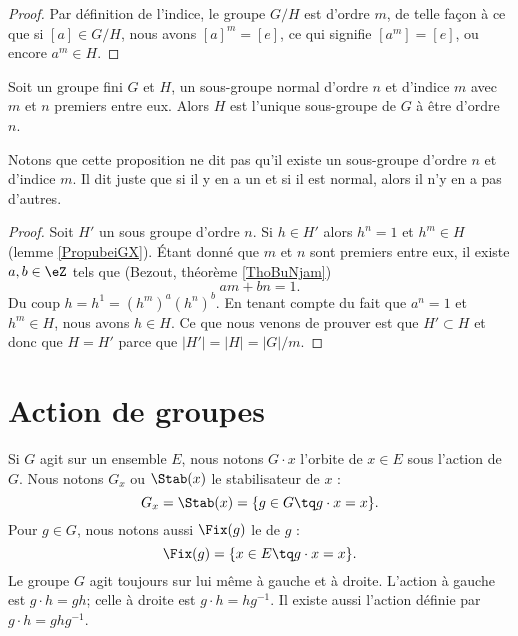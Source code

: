 \begin{proof}
    Par définition de l'indice, le groupe \( G/H\) est d'ordre \( m\), de telle façon à ce que si \( [a]\in G/H\), nous avons \( [a]^m=[e]\), ce qui signifie \( [a^m]=[e]\), ou encore \( a^m\in H\).
\end{proof}

\begin{proposition}
    Soit un groupe fini \( G\) et \( H\), un sous-groupe normal d'ordre \( n\) et d'indice \( m\) avec \( m\) et \( n\) premiers entre eux. Alors \( H\) est l'unique sous-groupe de \( G\) à être d'ordre \( n\).
\end{proposition}
Notons que cette proposition ne dit pas qu'il existe un sous-groupe d'ordre \( n\) et d'indice \( m\). Il dit juste que si il y en a un et si il est normal, alors il n'y en a pas d'autres.

\begin{proof}
    Soit \( H'\) un sous groupe d'ordre \( n\). Si \( h\in H'\) alors \( h^n=1\) et \( h^m\in H\) (lemme \ref{PropubeiGX}). Étant donné que \( m\) et \( n\) sont premiers entre eux, il existe \( a,b\in \eZ\) tels que (Bezout, théorème \ref{ThoBuNjam})
    \begin{equation}
        am+bn=1.
    \end{equation}
    Du coup \( h=h^1=(h^m)^a(h^n)^b\). En tenant compte du fait que \( a^n=1\) et \( h^m\in H\), nous avons \( h\in H\). Ce que nous venons de prouver est que \( H'\subset H\) et donc que \( H=H'\) parce que \( | H' |=| H |=| G |/m\).
\end{proof}
\section{Action de groupes}

Si \( G\) agit sur un ensemble \( E\), nous notons \( G\cdot x\) l'orbite de \( x\in E\) sous l'action de $G$. Nous notons \( G_x\) ou \( \Stab(x)\) le stabilisateur de \( x\) :
\begin{equation}
    G_x=\Stab(x)=\{ g\in G\tq g\cdot x=x \}.
\end{equation}
Pour \( g\in G\), nous notons aussi \( \Fix(g)\) le  de \( g\) :
\begin{equation}
    \Fix(g)=\{ x\in E\tq g\cdot x=x \}.
\end{equation}
Le groupe \( G\) agit toujours sur lui même à gauche et à droite. L'action à gauche est \( g\cdot h=gh\); celle à droite est \( g\cdot h=hg^{-1}\). Il existe aussi l'action  définie par \( g\cdot h=ghg^{-1}\).

